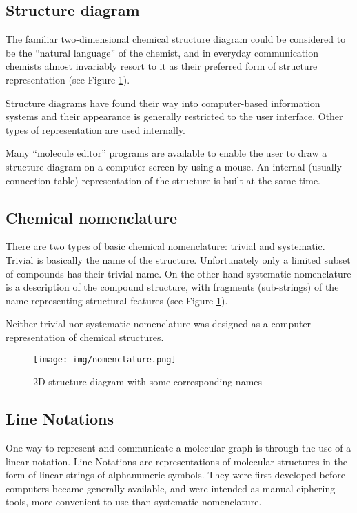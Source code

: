 \documentclass[thesis=M,english]{FITthesis}[2012/10/20]
\begin{document}
\subsection{Structure diagram}
\label{structureDiagramRef}
The familiar two-dimensional chemical structure diagram could be considered to
be the “natural language” of the chemist, and in everyday communication chemists almost invariably resort to it as their preferred form of structure representation (see Figure \ref{fig:nomenclature}).

Structure diagrams have found their way into computer-based information systems and their appearance is generally restricted to the user interface. Other types of representation are used internally.

Many “molecule editor” programs are available to enable the user to draw a structure diagram on a computer screen by using a mouse. An internal (usually connection table) representation of the structure is built at the same time.\cite{handbook}

\subsection{Chemical nomenclature}
There are two types of basic chemical nomenclature: trivial and systematic. Trivial is basically the name of the structure. Unfortunately only a limited subset of compounds has their trivial name. On the other hand systematic nomenclature is a description of the compound structure, with fragments (sub-strings) of the name representing structural features (see Figure \ref{fig:nomenclature}).\cite{handbook}

Neither trivial nor systematic nomenclature was designed as a computer representation of chemical structures.

\begin{figure}
  \centering
  \texttt{[image: img/nomenclature.png]}
  \caption{2D structure diagram with some corresponding names}
  \label{fig:nomenclature}
\end{figure}


\subsection{Line Notations}
One way to represent and communicate a molecular graph is through the use of a linear notation. Line Notations are representations of molecular structures in the form of linear strings of alphanumeric symbols. They were first developed before computers became generally available, and were intended as manual ciphering tools, more convenient to use than systematic nomenclature. 
\end{document}
